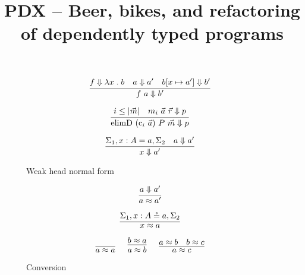 \documentclass{article}
\title{PDX -- Beer, bikes, and refactoring of dependently typed programs}
\begin{document}
\maketitle

\begin{figure}[h]
\caption{Weak head normal form}

$$
\infer
  []
  {\whnf{\app{f}{a}}{b'}}
{
  \whnf{f}{\lam{x}{b}}
  &
  \whnf{a}{a'}
  &
  \whnf{\sub{b}{x}{a'}}{b'}
}
$$

$$
\infer
  []
  {\whnf{\con{elimD}~(\con{c}_i~\vec{a})~P~\vec{m}}{p}}
{
  i \leq |\vec{m}|
  &
  \whnf{m_i~\vec{a}~\vec{r}}{p}
}
$$


$$
\infer
  []
  {\whnf{x}{a'}}
{
  \Sigma_1, \sigd{x}{A}{a}, \Sigma_2
  &
  \whnf{a}{a'}
}
$$

\end{figure}

\begin{figure}[h]
\caption{Conversion}

$$
\infer
  []
  {\conv{a}{a'}}
{
  \whnf{a}{a'}
}
$$

$$
\infer
  []
  {\conv{x}{a}}
{
  \Sigma_1, \sigr{x}{A}{a}, \Sigma_2
}
$$

$$
\infer
  []
  {\conv{a}{a}}
{
}
\quad
\infer
  []
  {\conv{a}{b}}
{
  \conv{b}{a}
}
\quad
\infer
  []
  {\conv{a}{c}}
{
  \conv{a}{b}
  &
  \conv{b}{c}
}
$$

\end{figure}
\end{document}
